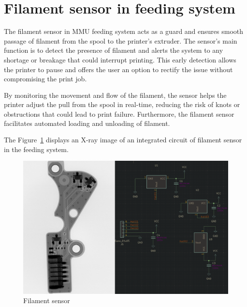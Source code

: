 \section{Filament sensor in feeding system}

The filament sensor in MMU feeding system acts as a guard and ensures smooth passage of filament from the spool to the printer's extruder. The sensor's main function is to detect the presence of filament and alerts the system to any shortage or breakage that could interrupt printing. This early detection allows the printer to pause and offers the user an option to rectify the issue without compromising the print job.

By monitoring the movement and flow of the filament, the sensor helps the printer adjust the pull from the spool in real-time, reducing the risk of knots or obstructions that could lead to print failure. Furthermore, the filament sensor facilitates automated loading and unloading of filament.

The Figure~\ref{fig:fsensor_ic} displays an X-ray image of an integrated circuit of filament sensor in the feeding system.

\begin{figure}[H]
    \centering
    \includegraphics[width=0.8\linewidth]{img/filament_sensor}
    \caption{Filament sensor}
    \label{fig:fsensor_ic} 
\end{figure}
